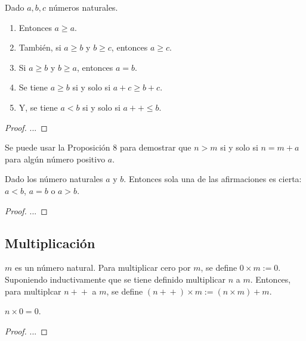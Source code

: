 \begin{proposition}
  Dado $a, b, c$ números naturales.

  \begin{enumerate}
  \item Entonces $a \geq a$.
  \item También, si $a \geq b$ y $b \geq c$, entonces $a \geq c$.
  \item Si $a \geq b$ y $b \geq a$, entonces $a = b$.
  \item Se tiene $a \geq b$ si y solo si $a + c \geq b + c$.
  \item Y, se tiene $a < b$ si y solo si $a\!+\!\!+ \leq b$.
  \end{enumerate}
\end{proposition}

\begin{proof}
  ...
\end{proof}

Se puede usar la Proposición 8 para demostrar que $n > m$ si y solo si $n = m + a$ para algún número positivo $a$.

\begin{proposition}
  Dado los número naturales $a$ y $b$. Entonces sola una de las afirmaciones es cierta: $a < b$, $a = b$ o $a > b$.
\end{proposition}

\begin{proof}
  ...
\end{proof}




\subsection{Multiplicación}

\begin{definition}
  $m$ es un número natural. Para multiplicar cero por $m$, se define $0 \times m := 0$. Suponiendo inductivamente que se tiene definido multiplicar $n$ a $m$. Entonces, para multiplcar $n\!+\!\!+$ a $m$, se define $(n\!+\!\!+) \times m := (n \times m) + m$.
\end{definition}

\begin{lemma}
  $n \times 0 = 0$.
\end{lemma}

\begin{proof}
  ...
\end{proof}

